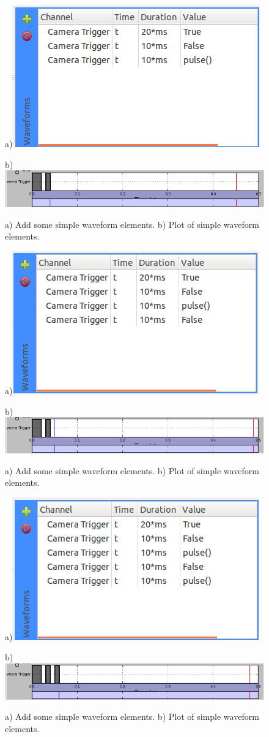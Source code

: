 \begin{figure}[ht]
  \centerline{a)\includegraphics[width=.5\textwidth]{figures/waveform-1}}
  \centerline{b)\includegraphics[width=.8\textwidth]{figures/plot-1}}
  \caption{a) Add some simple waveform elements. b) Plot of simple
  waveform elements.}
  \label{fig:quick:waveform-1}
\end{figure}

\begin{figure}[ht]
  \centerline{a)\includegraphics[width=.5\textwidth]{figures/waveform-2}}
  \centerline{b)\includegraphics[width=.8\textwidth]{figures/plot-2}}
  \caption{a) Add some simple waveform elements. b) Plot of simple
  waveform elements.}
  \label{fig:quick:waveform-2}
\end{figure}

\begin{figure}[ht]
  \centerline{a)\includegraphics[width=.5\textwidth]{figures/waveform-3}}
  \centerline{b)\includegraphics[width=.8\textwidth]{figures/plot-3}}
  \caption{a) Add some simple waveform elements. b) Plot of simple
  waveform elements.}
  \label{fig:quick:waveform-3}
\end{figure}


